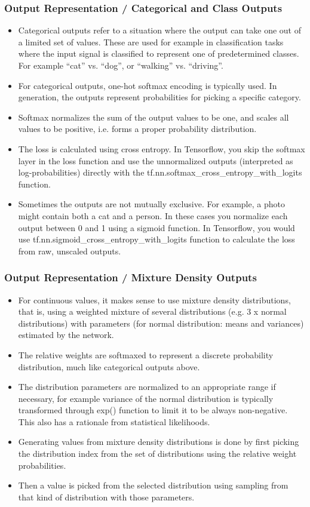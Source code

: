 \documentclass[8pt]{beamer}
\begin{document}
\begin{frame}
\frametitle{Output Representation / Categorical and Class Outputs}
 \begin{itemize}
  \item Categorical outputs refer to a situation where the output can take one out of a limited set of values. These are used for example in classification tasks where
        the input signal is classified to represent one of predetermined classes. For example ``cat'' vs. ``dog'', or ``walking'' vs. ``driving''.
  \item For categorical outputs, one-hot softmax encoding is typically used. In generation, the outputs represent probabilities for picking a specific category.
  \item Softmax normalizes the sum of the output values to be one, and scales all values to be positive, i.e. forms a proper probability distribution.
  \item The loss is calculated using cross entropy. In Tensorflow, you skip the softmax layer in the loss function and use the unnormalized outputs (interpreted as log-probabilities)
        directly with the tf.nn.softmax\_cross\_entropy\_with\_logits function.
  \item Sometimes the outputs are not mutually exclusive. For example, a photo might contain both a cat and a person. In these cases you normalize each output
        between 0 and 1 using a sigmoid function. In Tensorflow, you would use tf.nn.sigmoid\_cross\_entropy\_with\_logits function to calculate the loss from raw, unscaled outputs.
 \end{itemize}
\end{frame}

\begin{frame}
\frametitle{Output Representation / Mixture Density Outputs}
 \begin{itemize}
  \item For continuous values, it makes sense to use mixture density distributions, that is, using a weighted mixture of several distributions (e.g. 3 x normal distributions) with
        parameters (for normal distribution: means and variances) estimated by the network.
  \item The relative weights are softmaxed to represent a discrete probability distribution, much like categorical outputs above.
  \item The distribution parameters are normalized to an appropriate range if necessary, for example variance of the normal distribution
        is typically transformed through exp() function to
        limit it to be always non-negative. This also has a rationale from statistical likelihoods.
  \item Generating values from mixture density distributions is done by first picking the distribution index from the set of distributions using the relative weight probabilities.
  \item Then a value is picked from the selected distribution using sampling from that kind of distribution with those parameters.
 \end{itemize}
\end{frame}
\end{document}
